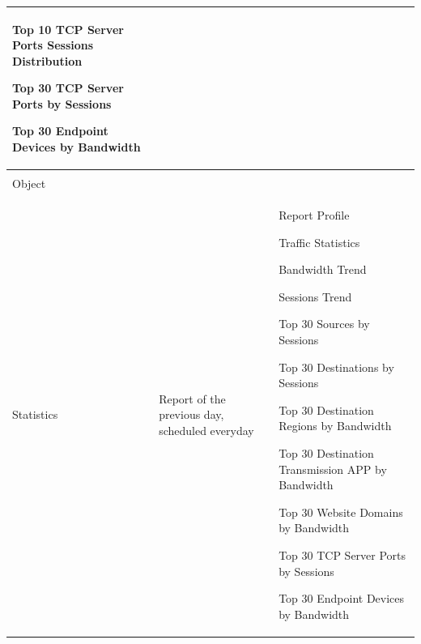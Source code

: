 \begin{longtable}{p{}|p{}|p{}}
                                                                                            Top 10 TCP Server Ports Sessions Distribution


                                                                                            Top 30 TCP Server Ports by Sessions


                                                                                            Top 30 Endpoint Devices by Bandwidth \\\hline 

    \tabincell{l}{Network\\ Object\\ Statistics} &	Report of the previous day, scheduled everyday &	Report Profile


                                                                                                        Traffic Statistics


                                                                                                        Bandwidth Trend


                                                                                                        Sessions Trend 


                                                                                                        Top 30 Sources by Sessions


                                                                                                        Top 30 Destinations by Sessions


                                                                                                        Top 30 Destination Regions by Bandwidth


                                                                                                        Top 30 Destination Transmission APP by Bandwidth


                                                                                                        Top 30 Website Domains by Bandwidth


                                                                                                        Top 30 TCP Server Ports by Sessions


                                                                                                        Top 30 Endpoint Devices by Bandwidth \\\hline


\end{longtable}
